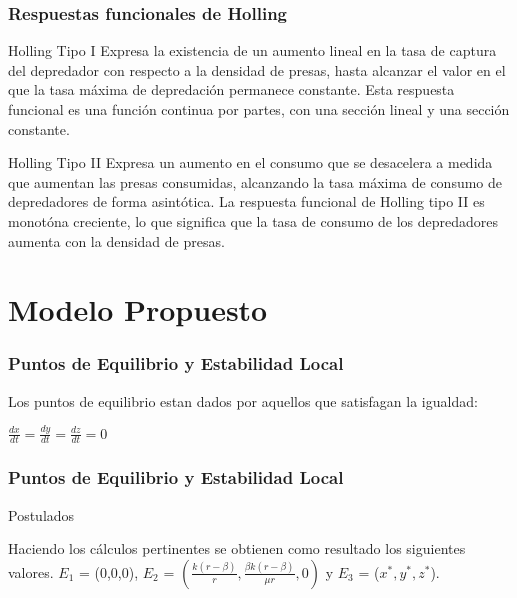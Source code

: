 \documentclass{beamer}
\begin{document}
\begin{frame}
	\frametitle{Respuestas funcionales de Holling}
	\begin{block}{Holling Tipo I}
		Expresa la existencia de un aumento lineal en la tasa de captura del depredador con respecto a la densidad de presas, hasta alcanzar el valor en
		el que la tasa máxima de depredación permanece constante. Esta respuesta funcional es una función continua por partes, con una sección lineal y una sección constante.
	\end{block}

	\begin{block}{Holling Tipo II}
		Expresa un aumento en el consumo que se desacelera a medida que aumentan las presas consumidas, alcanzando la tasa máxima de consumo de
		depredadores de forma asintótica. La respuesta funcional de Holling tipo II es monotóna creciente, lo que significa que la tasa de consumo
		de los depredadores aumenta con la densidad de presas.
	\end{block}
\end{frame}

\section{Modelo Propuesto}

\begin{frame}
	\frametitle{Puntos de Equilibrio y Estabilidad Local}
	\begin{minipage}{10cm}
		Los puntos de equilibrio estan dados por aquellos que satisfagan la igualdad:
		\begin{center}
			$\frac{dx}{dt} = \frac{dy}{dt} = \frac{dz}{dt} = 0$
		\end{center}
	\end{minipage}
\end{frame}

\begin{frame}
	\frametitle{Puntos de Equilibrio y Estabilidad Local}
	\begin{alertblock}{\begin{dinglist}{45}
				\item Postulados
			\end{dinglist}}
		\begin{minipage}{10cm}
			Haciendo los c\'alculos pertinentes se obtienen como resultado los siguientes valores.
			$E_1$ = (0,0,0), $E_2$ = $(\frac{k(r-\beta)}{r}, \frac{\beta k(r-\beta)}{\mu r}, 0)$ y $E_3$ = ($x^*,y^*,z^*$).
		\end{minipage}
	\end{alertblock}
\end{frame}
\end{document}
